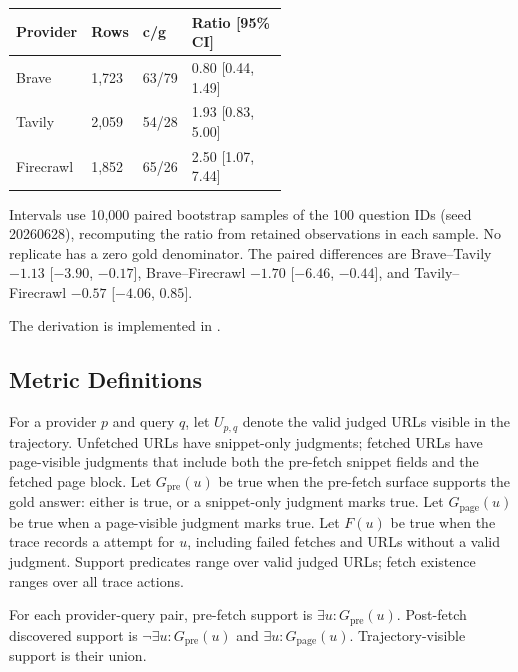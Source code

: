 \begin{center}
\footnotesize
\setlength{\tabcolsep}{3pt}
\begin{tabularx}{\linewidth}{@{}L{0.22\linewidth}R{0.16\linewidth}R{0.16\linewidth}Y@{}}
\toprule
\textbf{Provider} & \textbf{Rows} & \textbf{c/g} & \textbf{Ratio [95\% CI]} \\
\midrule
Brave & 1,723 & 63/79 & 0.80 [0.44, 1.49] \\
Tavily & 2,059 & 54/28 & 1.93 [0.83, 5.00] \\
Firecrawl & 1,852 & 65/26 & 2.50 [1.07, 7.44] \\
\bottomrule
\end{tabularx}
\label{tab:app-deduplicated-ratios}
\end{center}

Intervals use 10,000 paired bootstrap samples of the 100 question IDs (seed 20260628), recomputing the ratio from retained observations in each sample. No replicate has a zero gold denominator. The paired differences are Brave--Tavily $-1.13$ [$-3.90$, $-0.17$], Brave--Firecrawl $-1.70$ [$-6.46$, $-0.44$], and Tavily--Firecrawl $-0.57$ [$-4.06$, $0.85$].

The derivation is implemented in .

\subsection{Metric Definitions}
For a provider $p$ and query $q$, let $U_{p,q}$ denote the valid judged URLs visible in the trajectory. Unfetched URLs have snippet-only judgments; fetched URLs have page-visible judgments that include both the pre-fetch snippet fields and the fetched page block. Let $G_{\mathrm{pre}}(u)$ be true when the pre-fetch surface supports the gold answer: either \goldSnip{} is true, or a snippet-only judgment marks \containsGold{} true. Let $G_{\mathrm{page}}(u)$ be true when a page-visible judgment marks \goldPage{} true. Let $F(u)$ be true when the trace records a \fetchPage{} attempt for $u$, including failed fetches and URLs without a valid judgment. Support predicates range over valid judged URLs; fetch existence ranges over all trace actions.

For each provider-query pair, pre-fetch support is $\exists u:G_{\mathrm{pre}}(u)$. Post-fetch discovered support is $\neg\exists u:G_{\mathrm{pre}}(u)$ and $\exists u:G_{\mathrm{page}}(u)$. Trajectory-visible support is their union.

